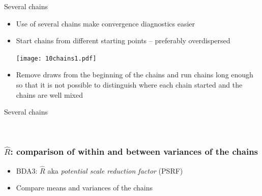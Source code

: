 \documentclass[finnish,english,t]{beamer}
\begin{document}
\begin{frame}{Several chains}

  \vspace{-0.5\baselineskip}
  \begin{itemize}
  \item Use of several chains make convergence diagnostics easier
    \item Start chains from different starting points -- preferably overdispersed
      \begin{center}
  \vspace{-0.5\baselineskip}
      \texttt{[image: 10chains1.pdf]}
    \end{center}
  \vspace{-0.5\baselineskip}
    \item<2-> Remove draws from the beginning of the chains and run
      chains long enough so that it is not possible to distinguish
      where each chain started and the chains are well mixed
  \end{itemize}

\end{frame}

\begin{frame}{Several chains}

      \begin{center}
      \\
    \end{center}

\end{frame}

\begin{frame}[fragile]
  \frametitle{$\widehat{R}$: comparison of within and between variances of the chains}

  \begin{itemize}
  \item BDA3: $\widehat{R}$ aka {\em potential scale reduction factor} (PSRF)
  \item Compare means and variances of the chains\\
    \vspace{1\baselineskip}
  \end{itemize}  

\end{frame}
\end{document}
